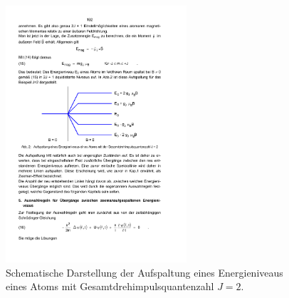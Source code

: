 \documentclass[
  bibliography=totoc,     %
  captions=tableheading,  %
  titlepage=firstiscover, %
]{scrartcl}
\begin{document}
\begin{figure}
    \centering
    \includegraphics[width=0.6\textwidth]{aufspaltung.pdf}
    \caption{Schematische Darstellung der Aufspaltung eines Energieniveaus eines Atoms mit Gesamtdrehimpulsquantenzahl $J=2$.\cite{anleitung}}
    \label{fig:aufspaltung}
\end{figure}
%
\end{document}
